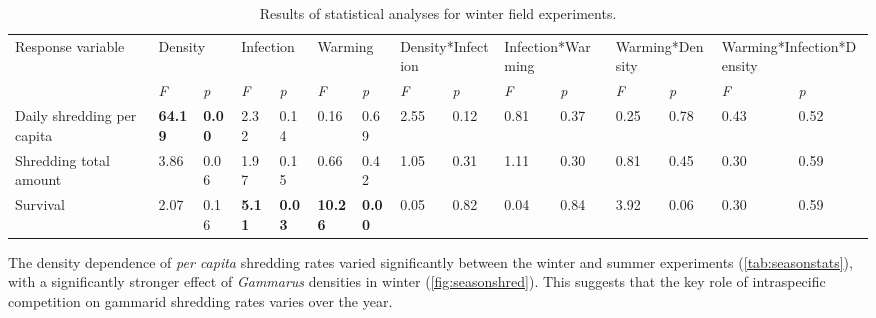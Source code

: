 \begin{table}[]
\caption[Individual and combined effects of group size, parasite infection and warming on rates of detritivory and survival of \emph{Gammarus duebeni}. Statistically significant effects are shown in bold.]{Results of statistical analyses for winter field experiments.}
\label{tab:winterstats}
\begin{tabular}{lllllllllllllll}
Response variable & \multicolumn{2}{l}{Density} & \multicolumn{2}{l}{Infection} & \multicolumn{2}{l}{Warming} & \multicolumn{2}{l}{Density*Infection} & \multicolumn{2}{l}{Infection*Warming} & \multicolumn{2}{l}{Warming*Density} & \multicolumn{2}{l}{Warming*Infection*Density} \\
\textit{} & \textit{F} & \textit{p} & \textit{F} & \textit{p} & \textit{F} & \textit{p} & \textit{F} & \textit{p} & \textit{F} & \textit{p} & \textit{F} & \textit{p} & \textit{F} & \textit{p} \\
Daily shredding per capita & \textbf{64.19} & \textbf{0.00} & 2.32 & 0.14 & 0.16 & 0.69 & 2.55 & 0.12 & 0.81 & 0.37 & 0.25 & 0.78 & 0.43 & 0.52 \\
Shredding total amount & 3.86 & 0.06 & 1.97 & 0.15 & 0.66 & 0.42 & 1.05 & 0.31 & 1.11 & 0.30 & 0.81 & 0.45 & 0.30 & 0.59 \\
Survival & 2.07 & 0.16 &  \textbf{5.11} & \textbf{0.03} & \textbf{10.26} & \textbf{0.00} & 0.05 & 0.82 & 0.04 & 0.84 & 3.92 & 0.06 & 0.30 & 0.59
\end{tabular}
\end{table}

The density dependence of \emph{per capita} shredding rates varied significantly between the winter and summer experiments (\ref{tab:seasonstats}), with a significantly stronger effect of \emph{Gammarus} densities in winter (\ref{fig:seasonshred}). This suggests that the key role of intraspecific competition on gammarid shredding rates varies over the year. 

